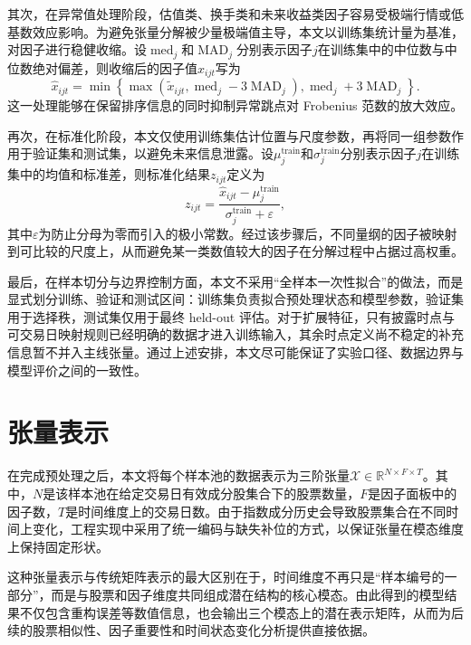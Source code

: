 其次，在异常值处理阶段，估值类、换手类和未来收益类因子容易受极端行情或低基数效应影响。为避免张量分解被少量极端值主导，本文以训练集统计量为基准，对因子进行稳健收缩。设$\operatorname{med}_j$和$\operatorname{MAD}_j$分别表示因子$j$在训练集中的中位数与中位数绝对偏差，则收缩后的因子值$\hat{x}_{ijt}$写为
\begin{equation}
\hat{x}_{ijt}
=\min\left\{\max\left(\tilde{x}_{ijt},\operatorname{med}_j-3\operatorname{MAD}_j\right),\operatorname{med}_j+3\operatorname{MAD}_j\right\}.
\end{equation}
这一处理能够在保留排序信息的同时抑制异常跳点对 Frobenius 范数的放大效应。

再次，在标准化阶段，本文仅使用训练集估计位置与尺度参数，再将同一组参数作用于验证集和测试集，以避免未来信息泄露。设$\mu_j^{\mathrm{train}}$和$\sigma_j^{\mathrm{train}}$分别表示因子$j$在训练集中的均值和标准差，则标准化结果$z_{ijt}$定义为
\begin{equation}
z_{ijt}=\frac{\hat{x}_{ijt}-\mu_j^{\mathrm{train}}}{\sigma_j^{\mathrm{train}}+\varepsilon},
\end{equation}
其中$\varepsilon$为防止分母为零而引入的极小常数。经过该步骤后，不同量纲的因子被映射到可比较的尺度上，从而避免某一类数值较大的因子在分解过程中占据过高权重。

最后，在样本切分与边界控制方面，本文不采用“全样本一次性拟合”的做法，而是显式划分训练、验证和测试区间：训练集负责拟合预处理状态和模型参数，验证集用于选择秩，测试集仅用于最终 held-out 评估。对于扩展特征，只有披露时点与可交易日映射规则已经明确的数据才进入训练输入，其余时点定义尚不稳定的补充信息暂不并入主线张量。通过上述安排，本文尽可能保证了实验口径、数据边界与模型评价之间的一致性。

\section{张量表示}

在完成预处理之后，本文将每个样本池的数据表示为三阶张量$\mathcal{X}\in\mathbb{R}^{N\times F\times T}$。其中，$N$是该样本池在给定交易日有效成分股集合下的股票数量，$F$是因子面板中的因子数，$T$是时间维度上的交易日数。由于指数成分历史会导致股票集合在不同时间上变化，工程实现中采用了统一编码与缺失补位的方式，以保证张量在模态维度上保持固定形状。

这种张量表示与传统矩阵表示的最大区别在于，时间维度不再只是“样本编号的一部分”，而是与股票和因子维度共同组成潜在结构的核心模态。由此得到的模型结果不仅包含重构误差等数值信息，也会输出三个模态上的潜在表示矩阵，从而为后续的股票相似性、因子重要性和时间状态变化分析提供直接依据。

